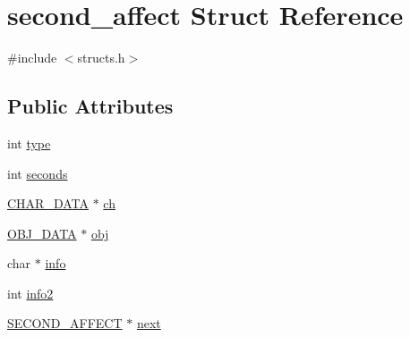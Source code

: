 \hypertarget{structsecond__affect}{\section{second\-\_\-affect Struct Reference}
\label{structsecond__affect}
}


{\ttfamily \#include $<$structs.\-h$>$}

\subsection*{Public Attributes}
\begin{DoxyCompactItemize}
\item 
int \hyperlink{structsecond__affect_a5fbce7cebaf58b39351eb73328961c8e}{type}
\item 
int \hyperlink{structsecond__affect_a1733466c66a4c38c8827ea8f04ebb95c}{seconds}
\item 
\hyperlink{structs_8h_af33ed1e66e8541a08bed257124f50f31}{C\-H\-A\-R\-\_\-\-D\-A\-T\-A} $\ast$ \hyperlink{structsecond__affect_a84480e01f74f2675eeedd316136ff2df}{ch}
\item 
\hyperlink{structs_8h_aaa59141dfc8c6ecdb6bfcf1537dd52d1}{O\-B\-J\-\_\-\-D\-A\-T\-A} $\ast$ \hyperlink{structsecond__affect_a7ecf982e7b8695beeb66092f9fda651a}{obj}
\item 
char $\ast$ \hyperlink{structsecond__affect_ab92fc06ae75014b5bf4d66270176b2c8}{info}
\item 
int \hyperlink{structsecond__affect_acf12f75277cf3a76670c8ed0e647c7e1}{info2}
\item 
\hyperlink{structs_8h_aa9a841dce5b261ba79a984ea3a1949cc}{S\-E\-C\-O\-N\-D\-\_\-\-A\-F\-F\-E\-C\-T} $\ast$ \hyperlink{structsecond__affect_ad173636951c2d251f5228a0eb987a267}{next}
\end{DoxyCompactItemize}


